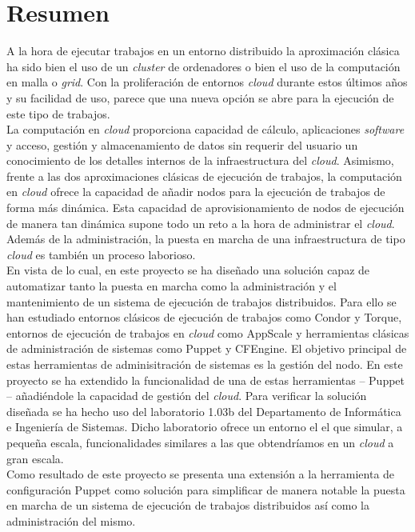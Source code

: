 \chapter{Resumen}
\label{cap:resumen}


A la hora de ejecutar trabajos en un entorno distribuido la aproximación clásica ha sido bien el uso de un \emph{cluster} de ordenadores o bien el uso de la computación en malla o \emph{grid}. Con la proliferación de entornos \emph{cloud} durante estos últimos años y su facilidad de uso, parece que una nueva opción se abre para la ejecución de este tipo de trabajos.\\

La computación en \emph{cloud} proporciona capacidad de cálculo, aplicaciones \emph{software} y acceso, gestión y almacenamiento de datos sin requerir del usuario un conocimiento de los detalles internos de la infraestructura del \emph{cloud}. Asimismo, frente a las dos aproximaciones clásicas de ejecución de trabajos, la computación en \emph{cloud} ofrece la capacidad de añadir nodos para la ejecución de trabajos de forma más dinámica. Esta capacidad de aprovisionamiento de nodos de ejecución de manera tan dinámica supone todo un reto a la hora de administrar el \emph{cloud}. Además de la administración, la puesta en marcha de una infraestructura de tipo \emph{cloud} es también un proceso laborioso.\\

En vista de lo cual, en este proyecto se ha diseñado una solución capaz de automatizar tanto la puesta en marcha como la administración y el mantenimiento de un sistema de ejecución de trabajos distribuidos. Para ello se han estudiado entornos clásicos de ejecución de trabajos como Condor y Torque, entornos de ejecución de trabajos en \emph{cloud} como AppScale y herramientas clásicas de administración de sistemas como Puppet y CFEngine. El objetivo principal de estas herramientas de adminisitración de sistemas es la gestión del nodo. En este proyecto se ha extendido la funcionalidad de una de estas herramientas -- Puppet -- añadiéndole la capacidad de gestión del \emph{cloud}. Para verificar la solución diseñada se ha hecho uso del laboratorio 1.03b del Departamento de Informática e Ingeniería de Sistemas. Dicho laboratorio ofrece un entorno el el que simular, a pequeña escala, funcionalidades similares a las que obtendríamos en un \emph{cloud} a gran escala.\\

Como resultado de este proyecto se presenta una extensión a la herramienta de configuración Puppet como solución para simplificar de manera notable la puesta en marcha de un sistema de ejecución de trabajos distribuidos así como la administración del mismo.

